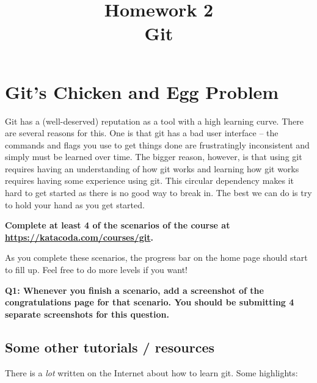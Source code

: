 \documentclass{article}
\begin{document}
\fancyhead[L]{}
\fancyhead[R]{}

\fancyfoot[C]{\color{gray} \thepage~/~\pageref*{LastPage}}
\pagestyle{fancyplain}

\title{\textbf{Homework 2\\Git}}
\author{\textbf{\color{red}{Due: Wednesday, September 25th, 11:59PM (Hard Deadline)}}}
\date{}
\maketitle

\section{Git's Chicken and Egg Problem}

Git has a (well-deserved) reputation as a tool with a high learning curve.
There are several reasons for this. One is that git has a bad user interface
-- the commands and flags you use to get things done are frustratingly
inconsistent and simply must be learned over time.
The bigger reason, however, is that using git requires having an understanding
of how git works and learning how git works requires having some experience
using git. This circular dependency makes it hard to get started as there is
no good way to break in. The best we can do is try to hold your hand as you
get started.

\medskip
\noindent
\textbf{Complete at least 4 of the scenarios of the course at \url{https://katacoda.com/courses/git}.}

As you complete these scenarios, the progress bar on the home page should start to fill up. Feel free to do more levels if you want!

\textbf{Q1: Whenever you finish a scenario, add a screenshot of the congratulations page for that scenario. You should be submitting 4 separate screenshots for this question.}

\subsection*{Some other tutorials / resources}

There is a \emph{lot} written on the Internet about how to learn git. Some
highlights:
\end{document}
